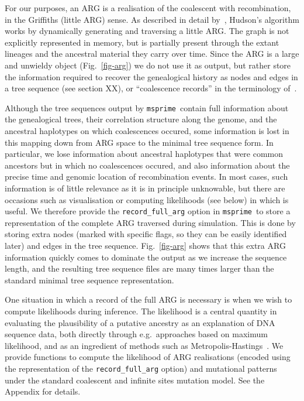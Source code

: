 \documentclass{article}
\newcommand{\msprime}[0]{\texttt{msprime}}
\begin{document}
For our purposes, an ARG is a realisation of the coalescent with
recombination, in the Griffiths (little ARG) sense.
As described in detail by~\cite{kelleher2016efficient}, Hudson's algorithm
works by dynamically generating and traversing a little ARG.
The graph is not explicitly represented in memory, but is partially
present through the extant lineages and the ancestral material they carry
over time. Since the ARG is a large and unwieldy object
(Fig.~\ref{fig-arg}) we do not use it as output, but
rather store the information required to recover the genealogical
history as nodes and edges in a tree sequence (see section XX),
or ``coalescence records'' in the terminology of~\citep{kelleher2016efficient}.

Although the tree sequences output by \msprime\ contain full information
about the genealogical trees, their correlation structure along the genome,
and the ancestral haplotypes on which coalescences occured, some information
is lost in this mapping down from ARG space to the minimal tree sequence
form. In particular, we lose
information about ancestral haplotypes that were common ancestors but
in which no coalescences occured, and also information about the precise time
and genomic location of recombination events. In most cases, such
information is of little relevance as it is in principle unknowable,
but there are occasions such as visualisation or computing likelihoods (see
below) in which is useful. We therefore provide
the \texttt{record\_full\_arg} option in \msprime\
to store a representation of the complete ARG traversed during simulation.
This is done by storing extra nodes (marked with specific flags, so they
can be easily identified later) and edges in the tree sequence.
Fig.~\ref{fig-arg} shows that this extra ARG information
quickly comes to dominate the output as we increase the sequence length,
and the resulting tree sequence files are many times larger
than the standard minimal tree sequence representation.

One situation in which a record of the full ARG is necessary is when we
wish to compute likelihoods during inference.
The likelihood is a central quantity in evaluating the plausibility of a putative
ancestry as an explanation of DNA sequence data, both directly through
e.g.~approaches based on maximum likelihood, and as an ingredient of
methods such as
Metropolis-Hastings~\citep{kuhner2000maximum,nielsen2000estimation,wang2008bayesian}.
We provide functions to compute the likelihood of ARG realisations
(encoded using the representation of the \texttt{record\_full\_arg} option)
and mutational patterns under
the standard coalescent and infinite sites mutation model.
See the Appendix for details.
\end{document}
